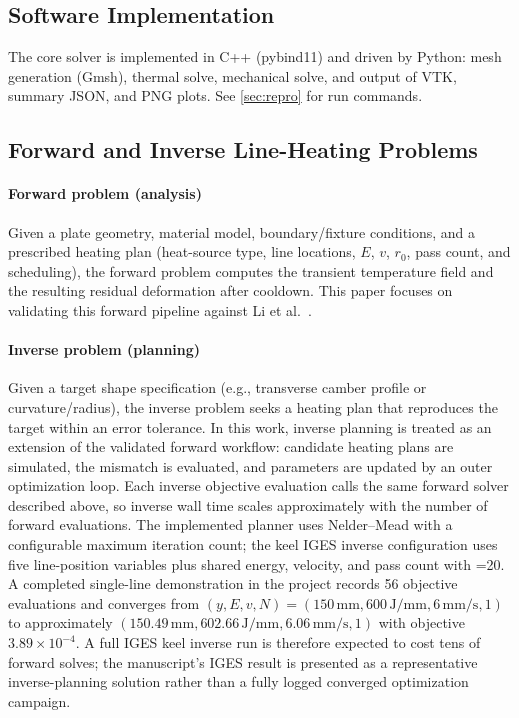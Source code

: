   \subsection{Software Implementation}
  The core solver is implemented in C++ (pybind11) and driven by Python: mesh generation (Gmsh), thermal solve, mechanical solve, and output of VTK, summary JSON, and PNG plots. See \cref{sec:repro} for run commands.

  \subsection{Forward and Inverse Line-Heating Problems}
  \label{sec:forward-inverse}

  \paragraph{Forward problem (analysis)}
  Given a plate geometry, material model, boundary/fixture conditions, and a prescribed heating plan (heat-source type, line locations, $E$, $v$, $r_0$, pass count, and scheduling), the forward problem computes the transient temperature field and the resulting residual deformation after cooldown. This paper focuses on validating this forward pipeline against Li et al.\ \cite{li2023}.

  \paragraph{Inverse problem (planning)}
  Given a target shape specification (e.g., transverse camber profile or curvature/radius), the inverse problem seeks a heating plan that reproduces the target within an error tolerance. In this work, inverse planning is treated as an extension of the validated forward workflow: candidate heating plans are simulated, the mismatch is evaluated, and parameters are updated by an outer optimization loop. Each inverse objective evaluation calls the same forward solver described above, so inverse wall time scales approximately with the number of forward evaluations. The implemented planner uses Nelder--Mead with a configurable maximum iteration count; the keel IGES inverse configuration uses five line-position variables plus shared energy, velocity, and pass count with =20. A completed single-line demonstration in the project records 56 objective evaluations and converges from $(y,E,v,N)=(150\,\mathrm{mm},600\,\mathrm{J/mm},6\,\mathrm{mm/s},1)$ to approximately $(150.49\,\mathrm{mm},602.66\,\mathrm{J/mm},6.06\,\mathrm{mm/s},1)$ with objective $3.89\times10^{-4}$. A full IGES keel inverse run is therefore expected to cost tens of forward solves; the manuscript's IGES result is presented as a representative inverse-planning solution rather than a fully logged converged optimization campaign.
